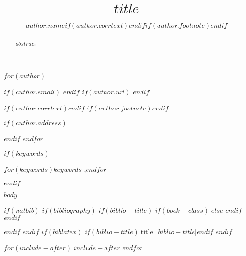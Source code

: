 \documentclass[$if(fontsize)$$fontsize$,$endif$$if(lang)$$babel-lang$,$endif$$if(papersize)$$papersize$paper,$endif$$for(classoption)$$classoption$$sep$,$endfor$]{elsarticle} %
\begin{document}
\begin{frontmatter}

  \title{$title$}
  
  $for(author)$
  \author[$author.label$]{$author.name$$if(author.corrtext)$$endif$$if(author.footnote)$$endif$}
  $if(author.email)$  $endif$
  $if(author.url)$  $endif$
  
  $if(author.corrtext)$$endif$
  $if(author.footnote)$$endif$
  
  $if(author.address)$ \address[$author.label$]{$author.address$}$endif$
  $endfor$

  \begin{abstract}
    $abstract$
  \end{abstract}
  
  $if(keywords)$ \begin{keyword} $for(keywords)$$keywords$ \sep $endfor$\end{keyword}$endif$

\end{frontmatter}

$body$


$if(natbib)$
$if(bibliography)$
$if(biblio-title)$
$if(book-class)$
\renewcommand\bibname{$biblio-title$}
$else$
\renewcommand\refname{$biblio-title$}
$endif$
$endif$


$endif$
$endif$
$if(biblatex)$
\printbibliography$if(biblio-title)$[title=$biblio-title$]$endif$
$endif$

$for(include-after)$
$include-after$
$endfor$
\end{document}
